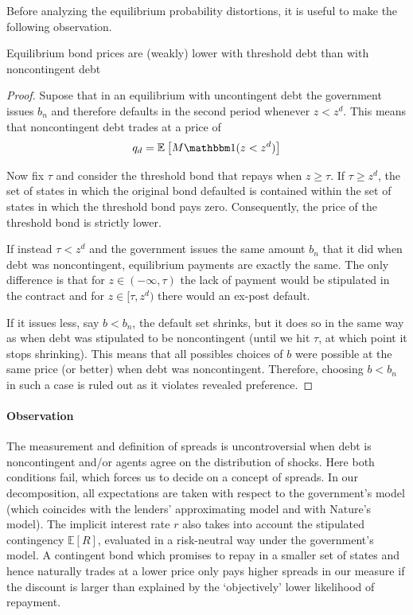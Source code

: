 Before analyzing the equilibrium probability distortions, it is useful to make the following observation.
\begin{lemma}
  Equilibrium bond prices are (weakly) lower with threshold debt than with noncontingent debt
  \begin{proof}
    Supose that in an equilibrium with uncontingent debt the government issues $b_n$ and therefore defaults in the second period whenever $z < z^d$. This means that noncontingent debt trades at a price of 
    \begin{align*}
      q_d = \ex{ M \ind(z < z^d) }
    \end{align*}

    Now fix $\tau$ and consider the threshold bond that repays when $z \geq \tau$. If $\tau \geq z^d$, the set of states in which the original bond defaulted is contained within the set of states in which the threshold bond pays zero. Consequently, the price of the threshold bond is strictly lower.
    
    If instead $\tau < z^d$ and the government issues the same amount $b_n$ that it did when debt was noncontingent, equilibrium payments are exactly the same. The only difference is that for $z \in (-\infty, \tau)$ the lack of payment would be stipulated in the contract and for $z \in [\tau, z^d)$ there would an ex-post default.
    
    If it issues less, say $b < b_n$, the default set shrinks, but it does so in the same way as when debt was stipulated to be noncontingent (until we hit $\tau$, at which point it stops shrinking). This means that all possibles choices of $b$ were possible at the same price (or better) when debt was noncontingent. Therefore, choosing $b < b_n$ in such a case is ruled out as it violates revealed preference.
  \end{proof}
\end{lemma}

\paragraph{Observation} The measurement and definition of spreads is uncontroversial when debt is noncontingent and/or agents agree on the distribution of shocks. Here both conditions fail, which forces us to decide on a concept of spreads. In our decomposition, all expectations are taken with respect to the government's model (which coincides with the lenders' approximating model and with Nature's model). The implicit interest rate $r$ also takes into account the stipulated contingency $\mathbb{E}[R]$, evaluated in a risk-neutral way under the government's model. A contingent bond which promises to repay in a smaller set of states and hence naturally trades at a lower price only pays higher spreads in our measure if the discount is larger than explained by the `objectively' lower likelihood of repayment.

